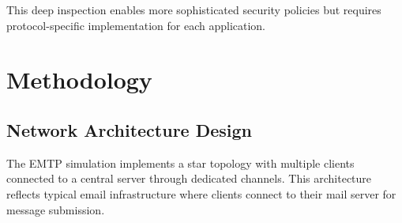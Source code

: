 \documentclass[12pt]{article}
\begin{document}
	This deep inspection enables more sophisticated security policies but requires protocol-specific implementation for each application.
	
	\section{Methodology}
	
	\subsection{Network Architecture Design}
	
	The EMTP simulation implements a star topology with multiple clients connected to a central server through dedicated channels. This architecture reflects typical email infrastructure where clients connect to their mail server for message submission.
	
\end{document}
